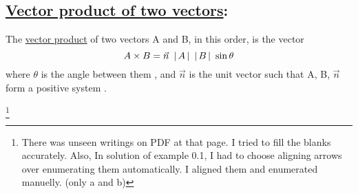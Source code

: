 \documentclass[11pt]{amsbook}
\begin{document}
        \subsection {\underline{Vector product of two vectors}:}
        The \underline{vector product} of two vectors A and B, in this order,
        is the vector
        $$ A\times B = \vec{n}\ \hAbs{A}\ \hAbs{B}\ \sin\theta$$
        where $\theta$ is the angle between them \hPairingParan{0\leq\theta\leq\pi}, and $\vec{n}$ is the unit vector such that A, B, $\vec{n}$ form a positive system .
    
    \footnote{There was unseen writings on PDF at that page. I tried to fill the blanks accurately. Also, In solution of example 0.1, I had to choose aligning arrows over enumerating them automatically. I aligned them and enumerated manuelly. (only a and b)}
\end{document}
